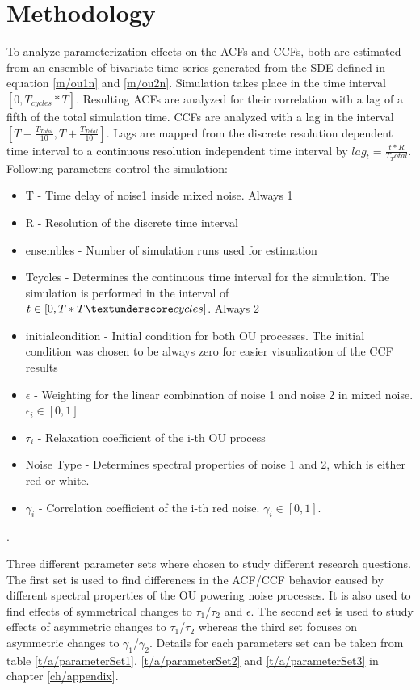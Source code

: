 \documentclass[a4paper,12pt,oneside]{book}
\theoremstyle{break}
\begin{document}

\chapter{Methodology}\label{ch/methodology}
To analyze parameterization effects on the \ac{ACF}s and \ac{CCF}s, both are estimated from an ensemble of bivariate time series generated from the \ac{SDE} defined in equation \ref{m/ou1n} and \ref{m/ou2n}. 
Simulation takes place in the time interval $[0, T_{cycles }* T]$.
Resulting \ac{ACF}s are analyzed for their correlation with a lag of a fifth of the total simulation time. 
\ac{CCF}s are analyzed with a lag in the interval $[T - \frac{T_{Total}}{10}, T + \frac{T_{Total}}{10}]$.
Lags are mapped from the discrete resolution dependent time interval to a continuous resolution independent time interval by $lag_t=\frac{t*R}{T_Total}$.
Following parameters control the simulation:

\begin{itemize}
	\item T - Time delay of noise1 inside mixed noise. Always 1
	\item R - Resolution of the discrete time interval
	\item ensembles - Number of simulation runs used for estimation
	\item T\textunderscore cycles - Determines the continuous time interval for the simulation. The simulation is performed in the interval of $t\in[0, T*T\textunderscore cycles]  $. Always 2
	\item initial\textunderscore condition - Initial condition for both \ac{OU} processes. The initial condition was chosen to be always zero for easier visualization of the \ac{CCF} results
	\item $\epsilon$ - Weighting for the linear combination of noise 1 and noise 2 in mixed noise. $\epsilon_i \in [0, 1]$
	\item $\tau_i$ - Relaxation coefficient of the i-th \ac{OU} process
	\item Noise Type - Determines spectral properties of noise 1 and 2, which is either red or white.
	\item $\gamma_i$ - Correlation coefficient of the i-th red noise. $\gamma_i \in [0, 1]$.
\end{itemize}.

Three different parameter sets where chosen to study different research questions. The first set is used to find differences in the \ac{ACF}/\ac{CCF} behavior caused by different spectral properties of the OU powering noise processes. It is also used to find effects of symmetrical changes to $\tau_1$/$\tau_2$ and $\epsilon$. The second set is used to study effects of asymmetric changes to $\tau_1$/$\tau_2$ whereas the third set focuses on asymmetric changes to $\gamma_1$/$\gamma_2$.
Details for each parameters set can be taken from table \ref{t/a/parameterSet1}, \ref{t/a/parameterSet2} and \ref{t/a/parameterSet3} in chapter \ref{ch/appendix}.
\end{document}
